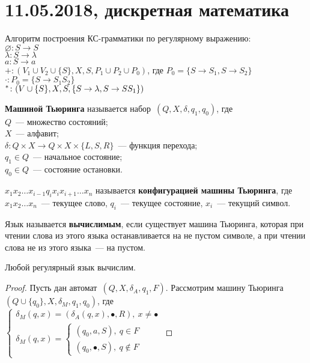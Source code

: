 \chapter{11.05.2018, дискретная математика}
Алгоритм построения КС-грамматики по регулярному выражению:\\
$\varnothing \colon S \to S$\\
$\lambda \colon S \to \lambda$\\
$a \colon S \to a$\\
$+ \colon (V_1 \cup V_2 \cup \{ S \}, X, S, P_1 \cup P_2 \cup P_0)$, где $P_0 = \{ S \to S_1, S \to S_2 \}$\\
$\cdot \colon P_0 = \{ S \to S_1 S_2 \}$\\
$\vphantom{s}^* \colon (V \cup \{ S \}, X, S, \{ S \to \lambda, S \to S S_1 \})$

 \textbf{Машиной Тьюринга} называется набор~$(Q, X, \delta, q_1, q_0)$, где\\
$Q$~--- множество состояний;\\
$X$~--- алфавит;\\
$\delta \colon Q \times X \to Q \times X \times \{ L, S, R \}$~--- функция перехода;\\
$q_1 \in Q$~--- начальное состояние;\\
$q_0 \in Q$~--- состояние остановки.

$x_1 x_2 \ldots x_{i-1} q_i x_i x_{i+1} \ldots x_n$ называется \textbf{конфигурацией машины Тьюринга}, где $x_1 x_2 \ldots x_n$~--- текущее слово, $q_i$~--- текущее состояние, $x_i$~--- текущий символ.

Язык называется \textbf{вычислимым}, если существует машина Тьюринга, которая при чтении слова из этого языка останавливается на не пустом символе, а при чтении слова не из этого языка~--- на пустом.

\begin{theorem}
Любой регулярный язык вычислим.
\end{theorem}
\begin{proof}
Пусть дан автомат~$(Q, X, \delta_A, q_1, F)$.
Рассмотрим машину Тьюринга~$(Q \cup \{ q_0 \}, X, \delta_M, q_1, q_0)$, где\\
$\begin{cases}
\delta_M(q, x) = (\delta_A(q, x), \bullet, R), \ x \neq \bullet \\
\delta_M(q, x) =
	\begin{cases}
	(q_0, a, S), \ q \in F \\
	(q_0, \bullet, S), \ q \notin F
	\end{cases}
\end{cases}$
\end{proof}


